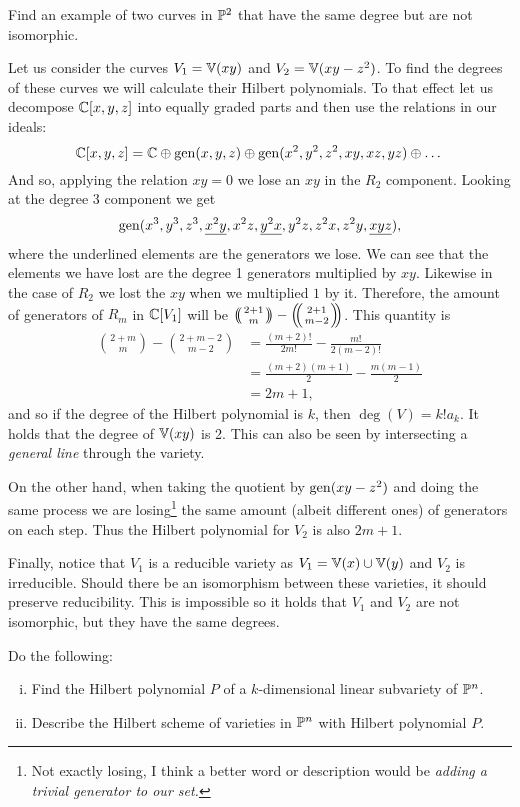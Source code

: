 \documentclass[12pt]{memoir}
\begin{document}
\begin{Ej}
	Find an example of two curves in $\mathbb{P}^2$ that have the same
	degree but are not isomorphic.
\end{Ej}

\begin{ptcbr}
Let us consider the curves $V_1=\mathbb{V}(xy)$ and $V_2=\mathbb{V}(xy-z^2)$. To find the degrees of these curves we will calculate their Hilbert polynomials. To that effect let us decompose $\mathbb{C}[x,y,z]$ into equally graded parts and then use the relations in our ideals:
$$\mathbb{C}[x,y,z]=\mathbb{C}\oplus \operatorname{gen}(x,y,z)\oplus\operatorname{gen}(x^2,y^2,z^2,xy,xz,yz)\oplus\dots$$
And so, applying the relation $xy=0$ we lose an $xy$ in the $R_2$ component. Looking at the degree 3 component we get 
$$\operatorname{gen}(x^3,y^3,z^3,\underline{x^2y},x^2z,\underline{y^2x},y^2z,z^2x,z^2y,\underline{xyz}),$$
where the underlined elements are the generators we lose. We can see that the elements we have lost are the degree 1 generators multiplied by $xy$. Likewise in the case of $R_2$ we lost the $xy$ when we multiplied $1$ by it. Therefore, the amount of generators of $R_m$ in $\mathbb{C}[V_1]$ will be $\multinom{2+1}{m}-\multinom{2+1}{m-2}$. This quantity is 
\begin{align*}
	\binom{2+m}{m}-\binom{2+m-2}{m-2}&=\frac{(m+2)!}{2m!}-\frac{m!}{2(m-2)!}\\
	&=\frac{(m+2)(m+1)}{2}-\frac{m(m-1)}{2}\\
	&=2m+1,
\end{align*}
and so if the degree of the Hilbert polynomial is $k$, then $\deg(V)=k!a_k$. It holds that the degree of $\mathbb{V}(xy)$ is 2. This can also be seen by intersecting a \emph{general line} through the variety.\par 
On the other hand, when taking the quotient by $\operatorname{gen}(xy-z^2)$ and doing the same process we are losing\footnote{Not exactly losing, I think a better word or description would be \emph{adding a trivial generator to our set.}} the same amount (albeit different ones) of generators on each step. Thus the Hilbert polynomial for $V_2$ is also $2m+1$.\par 
Finally, notice that $V_1$ is a reducible variety as $V_1=\mathbb{V}(x)\cup\mathbb{V}(y)$ and $V_2$ is irreducible. Should there be an isomorphism between these varieties, it should preserve reducibility. This is impossible so it holds that $V_1$ and $V_2$ are not isomorphic, but they have the same degrees.
\end{ptcbr}

\begin{Ej}
	Do the following:
	\begin{enumerate}[i)]
		\itemsep=-0.4em
		\item Find the Hilbert polynomial $P$ of a $k$-dimensional linear
		      subvariety of $\mathbb{P}^n$.
		\item  Describe the Hilbert scheme of varieties in $\mathbb{P}^n$ with Hilbert
		      polynomial $P$.
	\end{enumerate}

\end{Ej}
\end{document}
